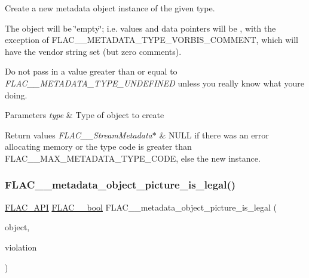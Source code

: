Create a new metadata object instance of the given type.

The object will be \char`\"{}empty\char`\"{}; i.\+e. values and data pointers will be {}, with the exception of F\+L\+A\+C\+\_\+\+\_\+\+M\+E\+T\+A\+D\+A\+T\+A\+\_\+\+T\+Y\+P\+E\+\_\+\+V\+O\+R\+B\+I\+S\+\_\+\+C\+O\+M\+M\+E\+NT, which will have the vendor string set (but zero comments).

Do not pass in a value greater than or equal to {\itshape F\+L\+A\+C\+\_\+\+\_\+\+M\+E\+T\+A\+D\+A\+T\+A\+\_\+\+T\+Y\+P\+E\+\_\+\+U\+N\+D\+E\+F\+I\+N\+ED} unless you really know what you\textquotesingle{}re doing.


\begin{DoxyParams}{Parameters}
{\em type} & Type of object to create \\
\hline
\end{DoxyParams}

\begin{DoxyRetVals}{Return values}
{\em F\+L\+A\+C\+\_\+\+\_\+\+Stream\+Metadata$\ast$} & {\ttfamily N\+U\+LL} if there was an error allocating memory or the type code is greater than F\+L\+A\+C\+\_\+\+\_\+\+M\+A\+X\+\_\+\+M\+E\+T\+A\+D\+A\+T\+A\+\_\+\+T\+Y\+P\+E\+\_\+\+C\+O\+DE, else the new instance. \\
\hline
\end{DoxyRetVals}
\mbox{\label{group__flac__metadata__object_ga2e389272f4df904e1652e79c89ca55c8}} 
\subsubsection{\texorpdfstring{FLAC\_\_metadata\_object\_picture\_is\_legal()}{FLAC\_\_metadata\_object\_picture\_is\_legal()}}
{\footnotesize\ttfamily \mbox{\hyperlink{group__flac__export_ga56ca07df8a23310707732b1c0007d6f5}{F\+L\+A\+C\+\_\+\+A\+PI}} \mbox{\hyperlink{ordinals_8h_a95103469f1cbd78b8cf250194985b34e}{F\+L\+A\+C\+\_\+\+\_\+bool}} F\+L\+A\+C\+\_\+\+\_\+metadata\+\_\+object\+\_\+picture\+\_\+is\+\_\+legal (\begin{DoxyParamCaption}\item[{const \mbox{\hyperlink{struct_f_l_a_c_____stream_metadata}{F\+L\+A\+C\+\_\+\+\_\+\+Stream\+Metadata}} $\ast$}]{object,  }\item[{const char $\ast$$\ast$}]{violation }\end{DoxyParamCaption})}

